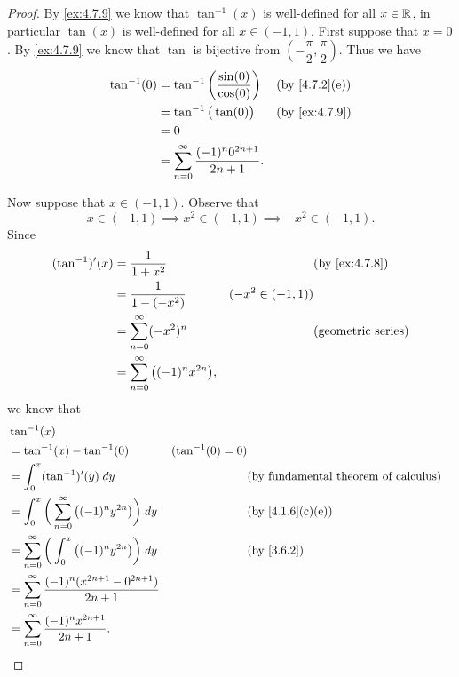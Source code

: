 \begin{proof}
  By \cref{ex:4.7.9} we know that \(\tan^{-1}(x)\) is well-defined for all \(x \in \mathbb{R}\), in particular \(\tan(x)\) is well-defined for all \(x \in (-1, 1)\).
  First suppose that \(x = 0\).
  By \cref{ex:4.7.9} we know that \(\tan\) is bijective from \((-\dfrac{\pi}{2}, \dfrac{\pi}{2})\).
  Thus we have
  \begin{align*}
    \tan^{-1}(0) & = \tan^{-1}\bigg(\dfrac{\sin(0)}{\cos(0)}\bigg)          &  & \text{(by \cref{4.7.2}(e))} \\
                 & = \tan^{-1}\big(\tan(0)\big)                             &  & \text{(by \cref{ex:4.7.9})} \\
                 & = 0                                                                                       \\
                 & = \sum_{n = 0}^\infty \dfrac{(-1)^n 0^{2n + 1}}{2n + 1}.
  \end{align*}

  Now suppose that \(x \in (-1, 1)\).
  Observe that
  \[
    x \in (-1, 1) \implies x^2 \in (-1, 1) \implies -x^2 \in (-1, 1).
  \]
  Since
  \begin{align*}
    (\tan^{-1})'(x) & = \dfrac{1}{1 + x^2}                           &                    & \text{(by \cref{ex:4.7.8})} \\
                    & = \dfrac{1}{1 - (-x^2)}                        & (-x^2 \in (-1, 1))                               \\
                    & = \sum_{n = 0}^\infty (-x^2)^n                 &                    & \text{(geometric series)}   \\
                    & = \sum_{n = 0}^\infty \big((-1)^n x^{2n}\big),
  \end{align*}
  we know that
  \begin{align*}
     & \tan^{-1}(x)                                                                                                                                  \\
     & = \tan^{-1}(x) - \tan^{-1}(0)                                              & (\tan^{-1}(0) = 0)                                               \\
     & = \int_0^x (\tan^{-1})'(y) \; dy                                           &                    & \text{(by fundamental theorem of calculus)} \\
     & = \int_{0}^x \bigg(\sum_{n = 0}^\infty \big((-1)^n y^{2n}\big)\bigg) \; dy &                    & \text{(by \cref{4.1.6}(c)(e))}              \\
     & = \sum_{n = 0}^\infty \bigg(\int_{0}^x \big((-1)^n y^{2n}\big)\bigg) \; dy &                    & \text{(by \cref{3.6.2})}                    \\
     & = \sum_{n = 0}^\infty \dfrac{(-1)^n (x^{2n + 1} - 0^{2n + 1})}{2n + 1}                                                                        \\
     & = \sum_{n = 0}^\infty \dfrac{(-1)^n x^{2n + 1}}{2n + 1}.
  \end{align*}


\end{proof}
